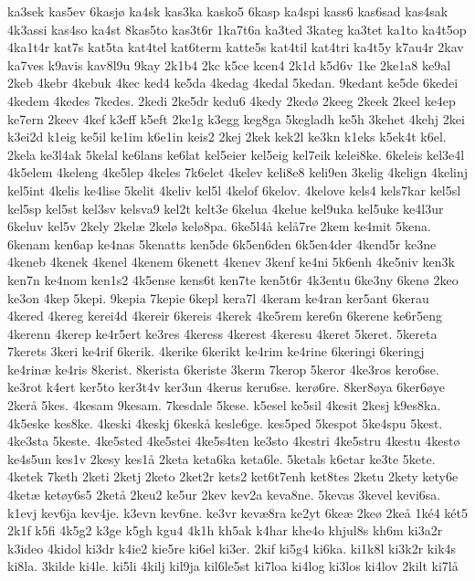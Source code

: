 {ka3sek
kas5ev
6kasj^^f8
ka4sk
kas3ka
kasko5
6kasp
ka4spi
kass6
kas6sad
kas4sak
4k3assi
kas4so
ka4st
8kas5to
kas3t6r
1ka7t6a
ka3ted
3kateg
ka3tet
ka1to
ka4t5op
4ka1t4r
kat7s
kat5ta
kat4tel
kat6term
katte5s
kat4til
kat4tri
ka4t5y
k7au4r
2kav
ka7ves
k9avis
kav8l9u
9kay
2k1b4
2kc
k5ce
kcen4
2k1d
k5d6v
1ke
2ke1a8
ke9al
2keb
4kebr
4kebuk
4kec
ked4
ke5da
4kedag
4kedal
5kedan.
9kedant
ke5de
6kedei
4kedem
4kedes
7kedes.
2kedi
2ke5dr
kedu6
4kedy
2ked^^f8
2keeg
2keek
2keel
ke4ep
ke7ern
2keev
4kef
k3eff
k5eft
2ke1g
k3egg
keg8ga
5kegladh
ke5h
3kehet
4kehj
2kei
k3ei2d
k1eig
ke5il
ke1im
k6e1in
keis2
2kej
2kek
kek2l
ke3kn
k1eks
k5ek4t
k6el.
2kela
ke3l4ak
5kelal
ke6lans
ke6lat
kel5eier
kel5eig
kel7eik
kelei8ke.
6keleis
kel3e4l
4k5elem
4keleng
4ke5lep
4keles
7k6elet
4kelev
keli8e8
keli9en
3kelig
4kelign
4kelinj
kel5int
4kelis
ke4lise
5kelit
4keliv
kel5l
4kelof
6kelov.
4kelove
kels4
kels7kar
kel5sl
kel5sp
kel5st
kel3sv
kelsva9
kel2t
kelt3e
6kelua
4kelue
kel9uka
kel5uke
ke4l3ur
6keluv
kel5v
2kely
2kel^^e6
2kel^^f8
kel^^f88pa.
6ke5l4^^e5
kel^^e57re
2kem
ke4mit
5kena.
6kenam
ken6ap
ke4nas
5kenatts
ken5de
6k5en6den
6k5en4der
4kend5r
ke3ne
4keneb
4kenek
4kenel
4kenem
6kenett
4kenev
3kenf
ke4ni
5k6enh
4ke5niv
ken3k
ken7n
ke4nom
ken1s2
4k5ense
kens6t
ken7te
ken5t6r
4k3entu
6ke3ny
6ken^^f8
2keo
ke3on
4kep
5kepi.
9kepia
7kepie
6kepl
kera7l
4keram
ke4ran
ker5ant
6kerau
4kered
4kereg
kerei4d
4kereir
6kereis
4kerek
4ke5rem
kere6n
6kerene
ke6r5eng
4kerenn
4kerep
ke4r5ert
ke3res
4keress
4kerest
4keresu
4keret
5keret.
5kereta
7kerets
3keri
ke4rif
6kerik.
4kerike
6kerikt
ke4rim
ke4rine
6keringi
6keringj
ke4rin^^e6
ke4ris
8kerist.
8kerista
6keriste
3kerm
7kerop
5keror
4ke3ros
kero6se.
ke3rot
k4ert
ker5to
ker3t4v
ker3un
4kerus
keru6se.
ker^^f86re.
8ker8^^f8ya
6ker6^^f8ye
2ker^^e5
5kes.
4kesam
9kesam.
7kesdale
5kese.
k5esel
ke5sil
4kesit
2kesj
k9es8ka.
4k5eske
kes8ke.
4keski
4keskj
6kesk^^e5
kesle6ge.
kes5ped
5kespot
5ke4spu
5kest.
4ke3sta
5keste.
4ke5sted
4ke5stei
4ke5s4ten
ke3sto
4kestri
4ke5stru
4kestu
4kest^^f8
ke4s5un
kes1v
2kesy
kes1^^e5
2keta
keta6ka
keta6le.
5ketals
k6etar
ke3te
5kete.
4ketek
7keth
2keti
2ketj
2keto
2ket2r
kets2
ket6t7enh
ket8tes
2ketu
2kety
kety6e
4ket^^e6
ket^^f8y6s5
2ket^^e5
2keu2
ke5ur
2kev
kev2a
keva8ne.
5kevas
3kevel
kevi6sa.
k1evj
kev6ja
kev4je.
k3evn
kev6ne.
ke3vr
kev^^e68ra
ke2yt
6ke^^e6
2ke^^f8
2ke^^e5
1k^^e94
k^^e9t5
2k1f
k5fi
4k5g2
k3ge
k5gh
kgu4
4k1h
kh5ak
k4har
khe4o
khjul8s
kh6m
ki3a2r
k3ideo
4kidol
ki3dr
k4ie2
kie5re
ki6el
ki3er.
2kif
ki5g4
ki6ka.
ki1k8l
ki3k2r
kik4s
ki8la.
3kilde
ki4le.
ki5li
4kilj
kil9ja
kil6le5st
ki7loa
ki4log
ki3los
ki4lov
2kilt
ki7l^^e5
}
